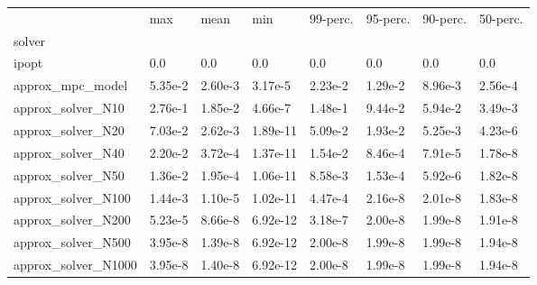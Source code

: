 \begin{tabular}{llllllll}
\toprule
 & max & mean & min & 99-perc. & 95-perc. & 90-perc. & 50-perc. \\
solver &  &  &  &  &  &  &  \\
\midrule
ipopt & 0.0 & 0.0 & 0.0 & 0.0 & 0.0 & 0.0 & 0.0 \\
approx_mpc_model & 5.35e-2 & 2.60e-3 & 3.17e-5 & 2.23e-2 & 1.29e-2 & 8.96e-3 & 2.56e-4 \\
approx_solver_N10 & 2.76e-1 & 1.85e-2 & 4.66e-7 & 1.48e-1 & 9.44e-2 & 5.94e-2 & 3.49e-3 \\
approx_solver_N20 & 7.03e-2 & 2.62e-3 & 1.89e-11 & 5.09e-2 & 1.93e-2 & 5.25e-3 & 4.23e-6 \\
approx_solver_N40 & 2.20e-2 & 3.72e-4 & 1.37e-11 & 1.54e-2 & 8.46e-4 & 7.91e-5 & 1.78e-8 \\
approx_solver_N50 & 1.36e-2 & 1.95e-4 & 1.06e-11 & 8.58e-3 & 1.53e-4 & 5.92e-6 & 1.82e-8 \\
approx_solver_N100 & 1.44e-3 & 1.10e-5 & 1.02e-11 & 4.47e-4 & 2.16e-8 & 2.01e-8 & 1.83e-8 \\
approx_solver_N200 & 5.23e-5 & 8.66e-8 & 6.92e-12 & 3.18e-7 & 2.00e-8 & 1.99e-8 & 1.91e-8 \\
approx_solver_N500 & 3.95e-8 & 1.39e-8 & 6.92e-12 & 2.00e-8 & 1.99e-8 & 1.99e-8 & 1.94e-8 \\
approx_solver_N1000 & 3.95e-8 & 1.40e-8 & 6.92e-12 & 2.00e-8 & 1.99e-8 & 1.99e-8 & 1.94e-8 \\
\bottomrule
\end{tabular}
